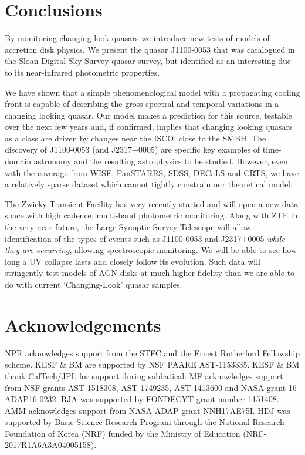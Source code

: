 \documentclass[a4paper,fleqn,usenatbib]{mnras}
\begin{document}
\section{Conclusions} 
By monitoring changing look quasars we introduce new
tests of models of accretion disk physics. We present the 
quasar J1100-0053 that was catalogued in the Sloan Digital 
Sky Survey quasar survey, but identified as an interesting due 
to its near-infrared photometric properties. 

We have shown that a simple
phenomenological model with a propagating cooling front is capable of
describing the gross spectral and temporal variations in a changing
looking quasar. Our model makes a prediction for this source, testable
over the next few years and, if confirmed, implies that changing
looking quasars as a class are driven by changes near the ISCO, close
to the SMBH. The discovery of J1100-0053 (and J2317+0005) are specific
key examples of time-domain astronomy and the resulting astrophysics
to be studied. However, even with the coverage from WISE, PanSTARRS,
SDSS, DECaLS and CRTS, we have a relatively sparse dataset which
cannot tightly constrain our theoretical model. 

The Zwicky Transient
Facility \citep[ZTF; ][]{Bellm2014} has very recently started and will
open a new data space with high cadence, multi-band photometric
monitoring. Along with ZTF in the very near future, the Large Synoptic
Survey Telescope \citep{Ivezic2008, LSST_ScienceBookV2} will allow
identification of the types of events such as J1100-0053 and
J2317+0005 \emph{while they are occurring}, allowing spectroscopic
monitoring. We will be able to see how long a UV collapse lasts and
closely follow its evolution.  Such data will stringently test models
of AGN disks at much higher fidelity than we are able to do with
current `Changing-Look' quasar samples.

\smallskip
\smallskip


\smallskip
\smallskip


\section*{Acknowledgements}
NPR acknowledges support from the STFC and the Ernest Rutherford
Fellowship scheme.  KESF \& BM are supported by NSF PAARE
AST-1153335. KESF \& BM thank CalTech/JPL for support during
sabbatical.  MF acknowledges support from NSF grants AST-1518308,
AST-1749235, AST-1413600 and NASA grant 16-ADAP16-0232.  RJA was
supported by FONDECYT grant number 1151408. AMM acknowledges support
from NASA ADAP grant NNH17AE75I. HDJ was supported by Basic Science
Research Program through the National Research Foundation of Korea
(NRF) funded by the Ministry of Education (NRF-2017R1A6A3A04005158).
\end{document}
